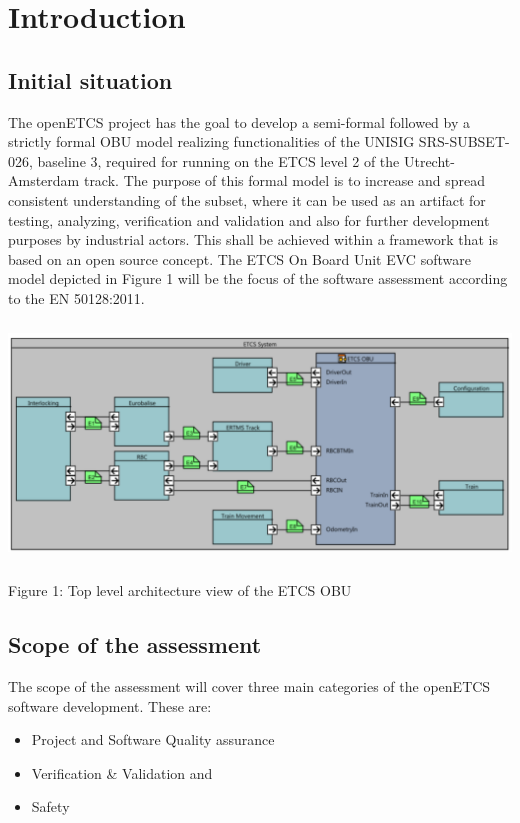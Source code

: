\section{Introduction}
\subsection{Initial situation}
The openETCS project has the goal to develop a semi-formal followed by a strictly formal OBU model realizing
functionalities of the UNISIG SRS-SUBSET-026, baseline 3, required for running on the ETCS level 2 of the
Utrecht-Amsterdam track. The purpose of this formal model is to increase and spread consistent understanding of the
subset, where it can be used as an artifact for testing, analyzing, verification and validation and also for further
development purposes by industrial actors. This shall be achieved within a framework that is based on an open source
concept. The ETCS On Board Unit EVC software model depicted in Figure 1 will be the focus of the software assessment
according to the EN 50128:2011.

 \includegraphics[width=14.552cm,height=6.35cm]{images/toplevelarchitecture.pdf} 

Figure 1: Top level architecture view of the ETCS OBU


\bigskip

\subsection{Scope of the assessment}
The scope of the assessment will cover three main categories of the openETCS software development. These are:

\liststyleLiv
\begin{itemize}
\item Project and Software Quality assurance 
\item Verification \& Validation and 
\item Safety 
\end{itemize}

